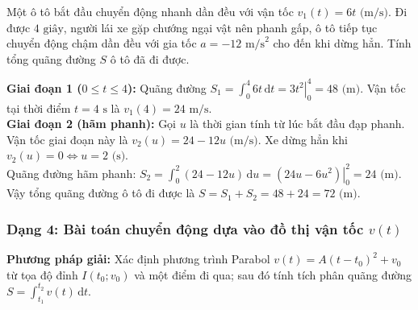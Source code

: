 \documentclass[12pt]{article}
\begin{document}
	\begin{vidu}[3]
		Một ô tô bắt đầu chuyển động nhanh dần đều với vận tốc $v_1(t) = 6t\text{ (m/s)}$. Đi được $4\text{ giây}$, người lái xe gặp chướng ngại vật nên phanh gấp, ô tô tiếp tục chuyển động chậm dần đều với gia tốc $a = -12\text{ m/s}^2$ cho đến khi dừng hẳn. Tính tổng quãng đường $S$ ô tô đã đi được.
	\end{vidu}
	\begin{loigiai}
		\textbf{Giai đoạn 1 ($0 \le t \le 4$):} Quãng đường $S_1 = \displaystyle \int_0^4 6t\,\mathrm{d}t = \left. 3t^2 \right|_0^4 = 48\text{ (m)}$. Vận tốc tại thời điểm $t = 4\text{ s}$ là $v_1(4) = 24\text{ m/s}$.\\
		\textbf{Giai đoạn 2 (hãm phanh):} Gọi $u$ là thời gian tính từ lúc bắt đầu đạp phanh. Vận tốc giai đoạn này là $v_2(u) = 24 - 12u\text{ (m/s)}$. Xe dừng hẳn khi $v_2(u) = 0 \iff u = 2\text{ (s)}$.\\
		Quãng đường hãm phanh: $S_2 = \displaystyle \int_0^2 (24 - 12u)\,\mathrm{d}u = \left. (24u - 6u^2) \right|_0^2 = 24\text{ (m)}$.\\
		Vậy tổng quãng đường ô tô đi được là $S = S_1 + S_2 = 48 + 24 = 72\text{ (m)}$.
	\end{loigiai}
	
	\subsubsection{Dạng 4: Bài toán chuyển động dựa vào đồ thị vận tốc $v(t)$}
	\noindent \textbf{Phương pháp giải:} Xác định phương trình Parabol $v(t) = A(t - t_0)^2 + v_0$ từ tọa độ đỉnh $I(t_0; v_0)$ và một điểm đi qua; sau đó tính tích phân quãng đường $S = \displaystyle \int_{t_1}^{t_2} v(t)\,\mathrm{d}t$.
	
\end{document}
